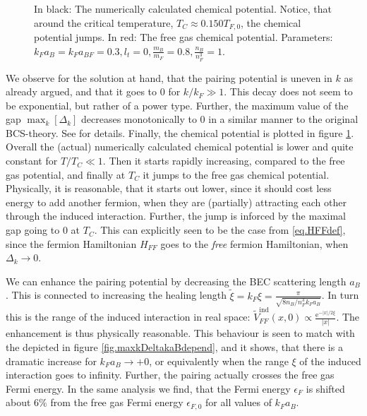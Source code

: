 \begin{figure} 
\begin{center}  
  
\caption{In black: The numerically calculated chemical potential. Notice, that around the critical temperature, $T_C \approx 0.150 T_{F,0}$, the chemical potential jumps. In red: The free gas chemical potential. Parameters: $k_F a_B = k_F a_{BF} = 0.3, l_t = 0, \frac{m_B}{m_F} = 0.8, \frac{n_B}{n_F^3} = 1$. }  
\label{fig.chempot}  
\end{center}    
\end{figure}

 We observe for the solution at hand, that the pairing potential is uneven in $k$ as already argued, and that it goes to 0 for $k/k_F \gg 1$. This decay does not seem to be exponential, but rather of a power type. Further, the maximum value of the gap $\max_k[\Delta_k]$ decreases monotonically to 0 in a similar manner to the original BCS-theory. See \cite{Tinkham,BruusFlensberg,PlischkeStatPhys} for details. Finally, the chemical potential is plotted in figure \ref{fig.chempot}. Overall the (actual) numerically calculated chemical potential is lower and quite constant for $T/T_C \ll 1$. Then it starts rapidly increasing, compared to the free gas potential, and finally at $T_C$ it jumps to the free gas chemical potential. Physically, it is reasonable, that it starts out lower, since it should cost less energy to add another fermion, when they are (partially) attracting each other through the induced interaction. Further, the jump is inforced by the maximal gap going to $0$ at $T_C$. This can explicitly seen to be the case from \eqref{eq.HFFdef}, since the fermion Hamiltonian $H_{FF}$ goes to the \textit{free} fermion Hamiltonian, when $\Delta_k \to 0$. 

 We can enhance the pairing potential by decreasing the BEC scattering length $a_B$. This is connected to increasing the healing length $\tilde{\xi} = k_F\xi = \frac{\pi}{\sqrt{8 n_B/n_F^3 k_Fa_B}}$. In turn this is the range of the induced interaction in real space: $\tilde{V}_{FF}^\text{ind}(x,0) \propto \frac{\text{e}^{-|x|/2\xi}}{|x|}$. The enhancement is thus physically reasonable. This behaviour is seen to match with the depicted in figure \ref{fig.maxkDeltakaBdepend}, and it shows, that there is a dramatic increase for $k_Fa_B \to +0$, or equivalently when the range $\xi$ of the induced interaction goes to infinity. Further, the pairing actually crosses the free gas Fermi energy. In the same analysis we find, that the Fermi energy $\epsilon_F$ is shifted about $6\%$ from the free gas Fermi energy $\epsilon_{F,0}$ for all values of $k_F a_B$.  

